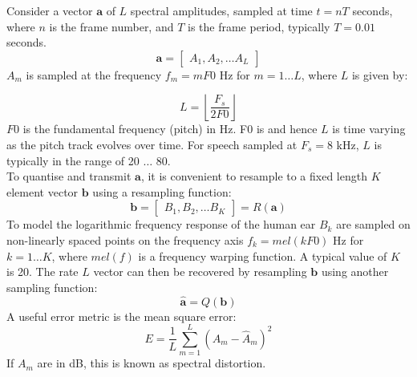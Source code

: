\documentclass[12]{article}
\begin{document}
Consider a vector $\mathbf{a}$ of $L$ spectral amplitudes, sampled at time $t=nT$ seconds, where $n$ is the frame number, and $T$ is the frame period, typically $T=0.01$ seconds. 
\begin{equation}
\mathbf{a} = \begin{bmatrix} A_1, A_2, \ldots A_L \end{bmatrix} 
\end{equation}
$A_m$ is sampled at the frequency $f_m=mF0$ Hz for $m=1 \ldots L$, where $L$ is given by:

\begin{equation}
L=\left \lfloor \frac{F_s}{2F0} \right \rfloor
\end{equation}
$F0$ is the fundamental frequency (pitch) in Hz. F0 is and hence $L$ is time varying as the pitch track evolves over time. For speech sampled at $F_s=8$ kHz, $L$ is typically in the range of 20 $\ldots$ 80. \\

To quantise and transmit $\mathbf{a}$, it is convenient to resample to a fixed length $K$ element vector $\mathbf{b}$ using a resampling function:
\begin{equation}
\mathbf{b} = \begin{bmatrix} B_1, B_2, \ldots B_K \end{bmatrix} = R(\mathbf{a})
\end{equation}
To model the logarithmic frequency response of the human ear $B_k$  are sampled on non-linearly spaced points on the frequency axis $f_k=mel(kF0)$ Hz for $k=1 \ldots K$, where $mel(f)$ is a frequency warping function. A typical value of $K$ is 20. The rate $L$ vector can then be recovered by resampling $\mathbf{b}$ using another sampling function:
\begin{equation}
\hat{\mathbf{a}} = Q(\mathbf{b})
\end{equation}
A useful error metric is the mean square error:
\begin{equation}
E=\frac{1}{L}\sum_{m=1}^{L}(A_m-\hat{A}_m)^2
\end{equation}
If $A_m$ are in dB, this is known as spectral distortion. \\
\end{document}
